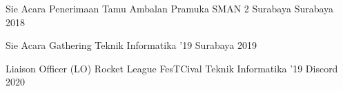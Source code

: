 

\begin{cvhonors}

  \cvhonor
    {Sie Acara} %
    {Penerimaan Tamu Ambalan Pramuka SMAN 2 Surabaya} %
    {Surabaya} %
    {2018} %

  \cvhonor
    {Sie Acara} %
    {Gathering Teknik Informatika '19} %
    {Surabaya} %
    {2019} %

  \cvhonor
    {Liaison Officer (LO) Rocket League} %
    {FesTCival Teknik Informatika '19} %
    {Discord} %
    {2020} %

\end{cvhonors}
